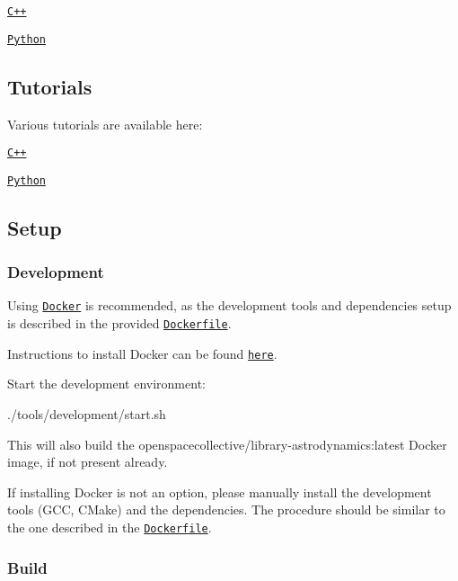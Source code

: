 \begin{DoxyItemize}
\item \href{https://open-space-collective.github.io/library-astrodynamics}{\tt C++}
\item \href{./bindings/python/docs}{\tt Python}
\end{DoxyItemize}

\subsection*{Tutorials}

Various tutorials are available here\+:


\begin{DoxyItemize}
\item \href{./tutorials/cpp}{\tt C++}
\item \href{./tutorials/python}{\tt Python}
\end{DoxyItemize}

\subsection*{Setup}

\subsubsection*{Development}

Using \href{https://www.docker.com}{\tt Docker} is recommended, as the development tools and dependencies setup is described in the provided \href{./tools/development/docker/Dockerfile}{\tt Dockerfile}.

Instructions to install Docker can be found \href{https://docs.docker.com/install/}{\tt here}.

Start the development environment\+:


\begin{DoxyCode}
./tools/development/start.sh
\end{DoxyCode}


This will also build the {\ttfamily openspacecollective/library-\/astrodynamics\+:latest} Docker image, if not present already.

If installing Docker is not an option, please manually install the development tools (G\+CC, C\+Make) and the dependencies. The procedure should be similar to the one described in the \href{./tools/development/docker/Dockerfile}{\tt Dockerfile}.

\subsubsection*{Build}

